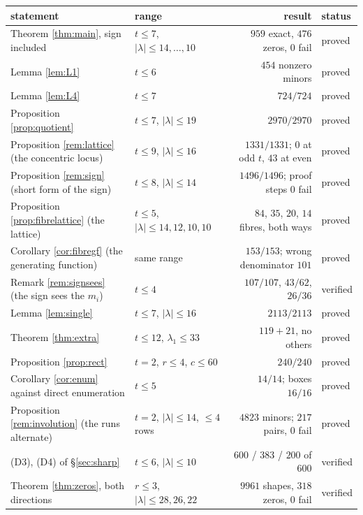 \documentclass[11pt,reqno]{amsart}
\newcommand{\stproved}{\textcolor{hproved}{\small proved}}
\newcommand{\stverif}{\textcolor{hverif}{\small verified}}
\theoremstyle{plain}
\theoremstyle{definition}
\begin{document}
\begin{center}\footnotesize\setlength{\tabcolsep}{4.2pt}
\begin{tabular}{llrl}
\toprule
statement & range & result & status\\
\midrule
Theorem \ref{thm:main}, sign included & $t\le7$, $|\lambda|\le14,\dots,10$ &
$959$ exact, $476$ zeros, $0$ fail & \stproved\\
Lemma \ref{lem:L1} & $t\le6$ & $454$ nonzero minors & \stproved\\
Lemma \ref{lem:L4} & $t\le7$ & $724/724$ & \stproved\\
Proposition \ref{prop:quotient} & $t\le7$, $|\lambda|\le19$ & $2970/2970$ & \stproved\\
Proposition \ref{rem:lattice} (the concentric locus) & $t\le9$, $|\lambda|\le16$ & $1331/1331$;
$0$ at odd $t$, $43$ at even & \stproved\\
Proposition \ref{rem:sign} (short form of the sign) & $t\le8$, $|\lambda|\le14$ & $1496/1496$;
proof steps $0$ fail & \stproved\\
Proposition \ref{prop:fibrelattice} (the lattice) & $t\le5$, $|\lambda|\le14,12,10,10$ &
$84$, $35$, $20$, $14$ fibres, both ways & \stproved\\
Corollary \ref{cor:fibregf} (the generating function) & same range &
$153/153$; wrong denominator $101$ & \stproved\\
Remark \ref{rem:signsees} (the sign sees the $m_i$) & $t\le4$ &
$107/107$, $43/62$, $26/36$ & \stverif\\
Lemma \ref{lem:single} & $t\le7$, $|\lambda|\le16$ & $2113/2113$ & \stproved\\
Theorem \ref{thm:extra} & $t\le12$, $\lambda_1\le33$ & $119+21$, no others & \stproved\\
Proposition \ref{prop:rect} & $t=2$, $r\le4$, $c\le60$ & $240/240$ & \stproved\\
Corollary \ref{cor:enum} against direct enumeration & $t\le5$ & $14/14$; boxes $16/16$ &
\stproved\\
Proposition \ref{rem:involution} (the runs alternate) & $t=2$, $|\lambda|\le14$, $\le4$ rows &
$4823$ minors; $217$ pairs, $0$ fail & \stproved\\
(D3), (D4) of \S\ref{sec:sharp} & $t\le6$, $|\lambda|\le10$ &
$600$ / $383$ / $200$ of $600$ & \stverif\\
\midrule
\rowcolor{hband} Theorem \ref{thm:zeros}, both directions & $r\le3$, $|\lambda|\le28,26,22$ &
$9961$ shapes, $318$ zeros, $0$ fail & \stverif\\

\end{tabular}
\end{center}
\end{document}
